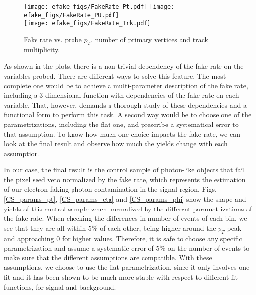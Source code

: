 \begin{figure}[h]
\begin{center}
{\label{FR_pt}\texttt{[image: efake\_figs/FakeRate\_Pt.pdf]}}
{\label{FR_pu}\texttt{[image: efake\_figs/FakeRate\_PU.pdf]}}
\\
{\label{FR_trk}\texttt{[image: efake\_figs/FakeRate\_Trk.pdf]}}
\caption{Fake rate vs. probe $p_T$, number of primary vertices and track multiplicity.}
\label{FR_all}
\end{center}
\end{figure}
%


As shown in the plots, there is a non-trivial dependency of the fake rate on the variables probed. There are different ways to solve this feature. The most complete one would be to achieve a multi-parameter description of the fake rate, including a 3-dimensional function with dependencies of the fake rate on each variable. That, however, demands a thorough study of these dependencies and a functional form to perform this task. A second way would be to choose one of the parametrizations, including the flat one, and prescribe a systematical error to that assumption. To know how much one choice impacts the fake rate, we can look at the final result and observe how much the yields change with each assumption.

In our case, the final result is the control sample of photon-like objects that fail the pixel seed veto normalized by the fake rate, which represents the estimation of our electron faking photon contamination in the signal region. Figs. \ref{CS_params_pt}, \ref{CS_params_eta} and \ref{CS_params_phi} show the shape and yields of this control sample when normalized by the different parametrizations of the fake rate. When checking the differences in number of events of each bin, we see that they are all within $5\%$ of each other, being higher around the $p_T$ peak and approaching $0$ for higher values. Therefore, it is safe to choose any specific parametrization and assume a systematic error of $5\%$ on the number of events to make sure that the different assumptions are compatible. With these assumptions, we choose to use the flat parametrization, since it only involves one fit and it has been shown to be much more stable with respect to different fit functions, for signal and background.


